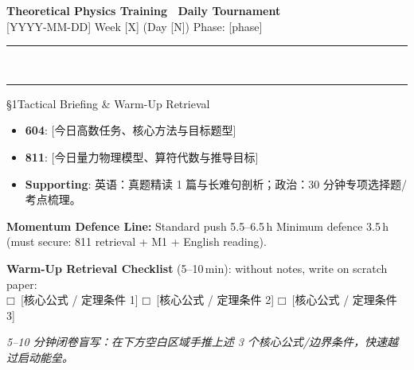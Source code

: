\documentclass[a4paper,11pt]{article}
\newcommand{\checkbox}{\ensuremath{\mdlgwhtsquare}}
\begin{document}
\begin{center}
  {\LARGE\bfseries\color{navy} Theoretical Physics Training \textperiodcentered\ Daily Tournament}\\[4pt]
  {\small\sffamily\color{mist} [YYYY-MM-DD] \quad\textbar\quad Week [X] (Day [N]) \quad\textbar\quad Phase: [phase]}\\[-3pt]
  {\color{navy}\rule{\textwidth}{0.8pt}}\\[-11pt]
  {\color{border}\rule{\textwidth}{0.3pt}}
\end{center}

\vspace{-4pt}

\begin{briefing}{\S 1\quad Tactical Briefing \& Warm-Up Retrieval}
\begin{itemize}[leftmargin=1.5em, itemsep=2pt, topsep=2pt]
  \item \textbf{604}: [今日高数任务、核心方法与目标题型]
  \item \textbf{811}: [今日量力物理模型、算符代数与推导目标]
  \item \textbf{Supporting}: 英语：真题精读 1 篇与长难句剖析；政治：30 分钟专项选择题/考点梳理。
\end{itemize}

\begin{notebox}
\textbf{Momentum Defence Line:} Standard push 5.5--6.5\,h \quad\textbar\quad Minimum defence 3.5\,h (must secure: 811 retrieval + M1 + English reading).
\end{notebox}

\vspace{1mm}
\textbf{Warm-Up Retrieval Checklist} (5--10\,min): without notes, write on scratch paper:\\
\checkbox\ [核心公式 / 定理条件 1] \quad
\checkbox\ [核心公式 / 定理条件 2] \quad
\checkbox\ [核心公式 / 定理条件 3]
\end{briefing}

\vspace{6pt}

\begin{tcolorbox}[
  enhanced, colback=white, colframe=border, boxrule=0.6pt, arc=2mm,
  left=4mm, right=4mm, top=3mm, bottom=3mm,
  fonttitle=\sffamily\bfseries\color{slate},
  title={\raisebox{0pt}{\color{royal}\rule{3pt}{10pt}}\hspace{4pt}Warm-Up Retrieval Workspace \textbar\ 白纸破冰草稿区},
  colbacktitle=paper, coltitle=slate,
  titlerule=0pt, toptitle=2mm, bottomtitle=2mm
]
\textcolor{mist}{\footnotesize\itshape 5--10 分钟闭卷盲写：在下方空白区域手推上述 3 个核心公式/边界条件，快速越过启动能垒。}
\vspace{9.2cm}
\end{tcolorbox}
\end{document}
